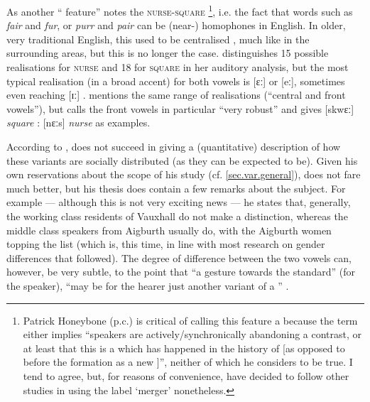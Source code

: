 As another `` feature'' \citet[72]{trudgill1999} notes the \textsc{nurse}-\textsc{square} \footnote{Patrick Honeybone (p.c.) is critical of calling this feature a  because the term either implies \enquote{speakers are actively/synchronically abandoning a contrast, or at least that this is a  which has happened in the history of  [as opposed to before the formation as a new ]}, neither of which he considers to be true. I tend to agree, but, for reasons of convenience, have decided to follow other studies \parencite{trudgill1999,watsonclark2013} in using the label \enquote*{merger} nonetheless.}, i.e. the fact that words such as \emph{fair} and \emph{fur}, or \emph{purr} and \emph{pair} can be (near-) homophones in  English.
In older, very traditional  English, this  used to be centralised \parencite[cf.][323]{west2015}, much like in the surrounding areas, but this is no longer the case.
\citet[cf.][68 and 71]{delyon1981} distinguishes 15 possible realisations for \textsc{nurse} and 18 for \textsc{square} in her auditory analysis, but the most typical realisation (in a broad  accent) for both vowels is [ɛː] or [eː], sometimes even reaching [ɪː] \citep[cf.][358]{watson2007}.
\citet[127]{honeybone2007} mentions the same range of realisations (``central and front vowels''), but calls the front vowels in particular ``very robust'' and gives [skwɛː] \emph{square} : [nɛːs] \emph{nurse} as examples.

According to \citet[358]{watson2007}, \textcite{delyon1981} does not succeed in giving a (quantitative) description of how these variants are socially distributed (as they can be expected to be).
Given his own reservations about the scope of his study (cf. \ref{sec.var.general}), \citet{knowles1973} does not fare much better, but his thesis does contain a few remarks about the subject.
For example --- although this is not very exciting news --- he states that, generally, the working class residents of Vauxhall do not make a distinction, whereas the middle class speakers from Aigburth usually do, with the Aigburth women topping the list (which is, this time, in line with most research on gender differences that followed).
The degree of difference between the two vowels can, however, be very subtle, to the point that ``a gesture towards the  standard'' (for the speaker), ``may be for the hearer just another variant of a  '' \citep[cf.][295--297]{knowles1973}.

